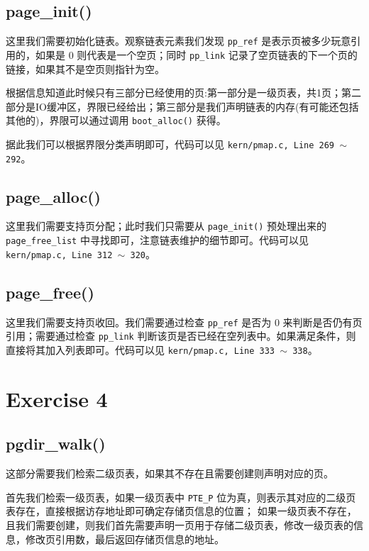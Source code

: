 \documentclass[11pt]{article}
\begin{document}
	\subsection*{page\_init()}
		\par 这里我们需要初始化链表。观察链表元素我们发现 \texttt{pp\_ref} 是表示页被多少玩意引用的，如果是 0 则代表是一个空页；同时 \texttt{pp\_link} 记录了空页链表的下一个页的链接，如果其不是空页则指针为空。
		
		\par 根据信息知道此时候只有三部分已经使用的页:第一部分是一级页表，共1页；第二部分是IO缓冲区，界限已经给出；第三部分是我们声明链表的内存(有可能还包括其他的)，界限可以通过调用 \texttt{boot\_alloc()} 获得。
		
		\par 据此我们可以根据界限分类声明即可，代码可以见 \texttt{kern/pmap.c, Line 269 $\sim$ 292}。
		
	\subsection*{page\_alloc()}
		\par 这里我们需要支持页分配；此时我们只需要从 \texttt{page\_init()} 预处理出来的 \texttt{page\_free\_list} 中寻找即可，注意链表维护的细节即可。代码可以见 \texttt{kern/pmap.c, Line 312 $\sim$ 320}。
	
	\subsection*{page\_free()}
		\par 这里我们需要支持页收回。我们需要通过检查 \texttt{pp\_ref} 是否为 0 来判断是否仍有页引用；需要通过检查 \texttt{pp\_link} 判断该页是否已经在空列表中。如果满足条件，则直接将其加入列表即可。代码可以见 \texttt{kern/pmap.c, Line 333 $\sim$ 338}。
		
	\section{Exercise 4}
	
	\subsection*{pgdir\_walk()}
		\par 这部分需要我们检索二级页表，如果其不存在且需要创建则声明对应的页。
		\par 首先我们检索一级页表，如果一级页表中 \texttt{PTE\_P} 位为真，则表示其对应的二级页表存在，直接根据访存地址即可确定存储页信息的位置；
		如果一级页表不存在，且我们需要创建，则我们首先需要声明一页用于存储二级页表，修改一级页表的信息，修改页引用数，最后返回存储页信息的地址。
		
\end{document}
